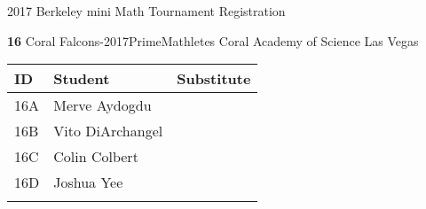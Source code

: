 \documentclass[12pt]{amsart}
\begin{document}
\newpage



\renewcommand{\TeamID}{16}
\renewcommand{\TeamName}{Coral Falcons-2017PrimeMathletes }
\renewcommand{\SchoolName}{Coral Academy of Science Las Vegas}
\renewcommand{\IDA}{16A}
\renewcommand{\IDB}{16B}
\renewcommand{\IDC}{16C}
\renewcommand{\IDD}{16D}
\renewcommand{\IDE}{}
\renewcommand{\StudentA}{Merve Aydogdu}
\renewcommand{\StudentB}{Vito DiArchangel}
\renewcommand{\StudentC}{Colin Colbert}
\renewcommand{\StudentD}{Joshua Yee}
\renewcommand{\StudentE}{}

\begin{center}
{\sc \Large 2017 Berkeley mini Math Tournament Registration}

\bigskip
\bigskip

{\bf \Large  \TeamID} \hfill {\large \TeamName} \hfill {\large \SchoolName}

\bigskip
\bigskip

\begin{tabular}{| p{} | p{} | p{} |}
\hline
\bf ID         & \bf Student             & \bf Substitute             \\ \hline
\IDA           & \StudentA               &                            \\ \hline
\IDB           & \StudentB               &                            \\ \hline
\IDC           & \StudentC               &                            \\ \hline
\IDD           & \StudentD               &                            \\ \hline
\IDE           & \StudentE               &                            \\ \hline
\end{tabular} 
\end{center}
\bigskip
\bigskip

\newpage



\renewcommand{\TeamID}{17}
\renewcommand{\TeamName}{Coral Falcons-7x11x13}
\renewcommand{\SchoolName}{Coral Academy of Science Las Vegas}
\renewcommand{\IDA}{17A}
\renewcommand{\IDB}{17B}
\renewcommand{\IDC}{17C}
\renewcommand{\IDD}{17D}
\renewcommand{\IDE}{17E}
\renewcommand{\StudentA}{Freya Zhang}
\renewcommand{\StudentB}{Ashleigh Quiambao}
\renewcommand{\StudentC}{Dylan Dang}
\renewcommand{\StudentD}{Shenlone Wu}
\renewcommand{\StudentE}{Shenmei Wu}
\end{document}
